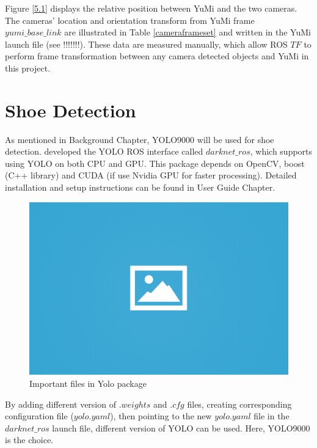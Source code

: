 Figure \ref{5.1} displays the relative position between YuMi and the two cameras. The cameras' location and orientation transform from YuMi frame $yumi\_base\_link$ are illustrated in Table \ref{cameraframeset} and written in the YuMi launch file (see !!!!!!!). These data are measured manually, which allow ROS $TF$ to perform frame transformation between any camera detected objects and YuMi in this project. 
\begin{table}[H]
\centering
{}
\caption{Transform settings between YuMi and cameras}
\label{cameraframeset}
\end{table}

\section{Shoe Detection} \label{shoedetection}
As mentioned in Background Chapter, YOLO9000 will be used for shoe detection. \citep{bjelonicYolo2018} developed the YOLO ROS interface called $darknet\_ros$, which supports using YOLO on both CPU and GPU. This package depends on OpenCV, boost (C++ library) and CUDA (if use Nvidia GPU for faster processing). Detailed installation and setup instructions can be found in User Guide Chapter. 

\begin{figure}[H]
\centering
\includegraphics[width = 0.5\columnwidth]{images/ph.png}
\caption{Important files in Yolo package}
\label{yolofolder}
\end{figure}

By adding different version of $.weights$ and $.cfg$ files, creating corresponding configuration file ($yolo.yaml$), then pointing to the new $yolo.yaml$ file in the $darknet\_ros$ launch file, different version of YOLO can be used. Here, YOLO9000 is the choice.

